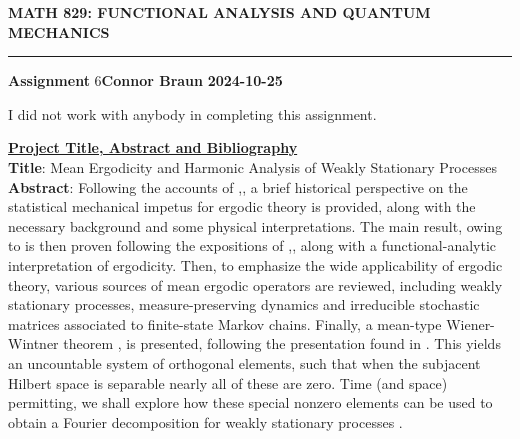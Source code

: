 \documentclass[10pt]{article}
\newcommand{\1}[1]{\mathbbm{1}_{#1}} \newcommand{\mc}[1]{\mathcal{#1}}
\begin{document}
    \begin{center}
        {\bf\large{MATH 829: FUNCTIONAL ANALYSIS AND QUANTUM MECHANICS}}
        \smallskip
        \hrule
        \smallskip
        {\bf Assignment} 6\hfill {\bf Connor Braun} \hfill {\bf 2024-10-25}
    \end{center}
    \vspace{5pt}
    \begin{center}
        \begin{minipage}{\dimexpr\paperwidth-10cm}
            I did not work with anybody in completing this assignment.
        \end{minipage}
    \end{center}
    \noindent\underline{\textbf{Project Title, Abstract and Bibliography}}\\[5pt]
    \textbf{Title}: Mean Ergodicity and Harmonic Analysis of Weakly Stationary Processes\\[5pt]
    \textbf{Abstract}: Following the accounts of \cite[ch. 1,8]{Eisner_etal_2015},\cite[ch. II.5]{Reed_Simon_1980}, a brief historical perspective on the statistical mechanical impetus
    for ergodic theory is provided, along with the necessary background and some
    physical interpretations. The main result, owing to \cite{Neumann_1932} is
    then proven following the expositions of \cite{Eisner_etal_2015},\cite{Reed_Simon_1980}, \cite{Weber_2009} along with a
    functional-analytic interpretation of ergodicity. Then, to emphasize the
    wide applicability of ergodic theory, various sources of mean ergodic operators
    are reviewed, including weakly stationary processes, measure-preserving
    dynamics and irreducible stochastic matrices associated to finite-state Markov chains.
    Finally, a mean-type Wiener-Wintner theorem \cite{Wiener_Wintner_1941}, \cite{Assani_2003} is
    presented, following the presentation found in \cite{Weber_2009}. This yields an
    uncountable system of orthogonal elements, such that when the subjacent
    Hilbert space is separable nearly all of these are zero. Time (and space) permitting, we
    shall explore how these special nonzero elements can be used to obtain a Fourier
    decomposition for weakly stationary processes \cite[$\S$6]{Fan_1946}.
    
    
\end{document}
